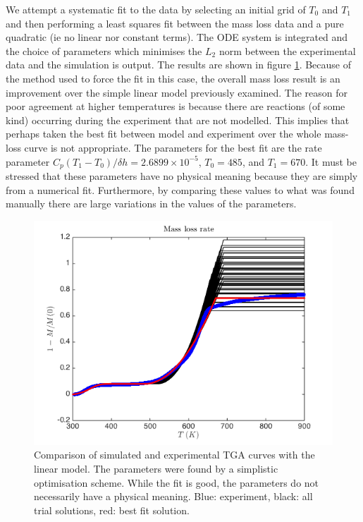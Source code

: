 \documentclass[reqno]{amsart}
\begin{document}
We attempt a systematic fit to the data by selecting an initial grid of $T_0$ and $T_1$ and then performing a least squares fit between the mass loss data and a pure quadratic (ie no linear nor constant terms). 
The ODE system is integrated and the choice of parameters which minimises the $L_2$ norm between the experimental data and the simulation is output.
The results are shown in figure \ref{fig:simulatedTGAfitted}.
Because of the method used to force the fit in this case, the overall mass loss result is an improvement over the simple linear model previously examined. 
The reason for poor agreement at higher temperatures is because there are reactions (of some kind) occurring during the experiment that are not modelled. 
This implies that perhaps taken the best fit between model and experiment over the whole mass-loss curve is not appropriate. 
The parameters for the best fit are the rate parameter $C_p(T_1-T_0)/\delta h=2.6899\times 10^{-5}$, $T_0=485$, and $T_1=670$. 
It must be stressed that these parameters have no physical meaning because they are simply from a numerical fit. 
Furthermore, by comparing these values to what was found manually there are large variations in the values of the parameters. 
\begin{figure}[h!b]
\centering
  \includegraphics[scale=0.5]{tgaLinearFitted.png}
\caption{Comparison of simulated and experimental TGA curves with the linear model. The parameters were found by a simplistic optimisation scheme. While the fit is good, the parameters do not necessarily have a physical meaning. Blue: experiment, black: all trial solutions, red: best fit solution.}
\label{fig:simulatedTGAfitted}
\end{figure}
\end{document}
